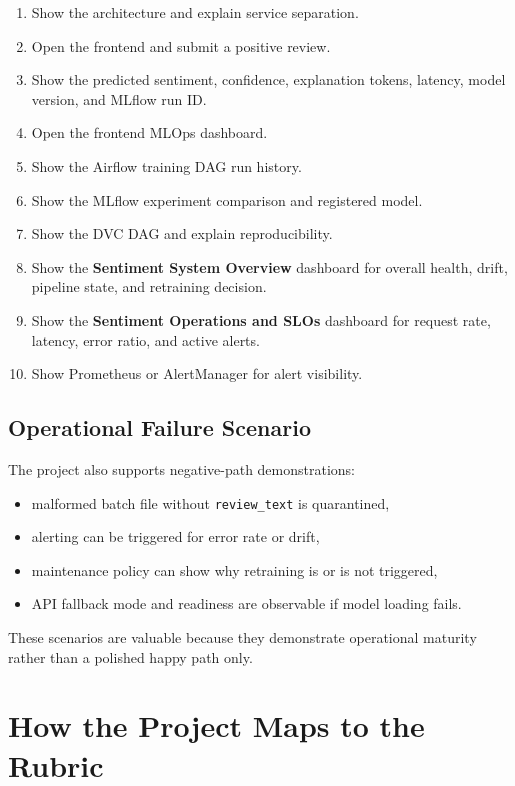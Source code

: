 \documentclass[11pt,a4paper]{article}
\begin{document}
\begin{enumerate}[leftmargin=1.6em]
  \item Show the architecture and explain service separation.
  \item Open the frontend and submit a positive review.
  \item Show the predicted sentiment, confidence, explanation tokens, latency, model version, and MLflow run ID.
  \item Open the frontend MLOps dashboard.
  \item Show the Airflow training DAG run history.
  \item Show the MLflow experiment comparison and registered model.
  \item Show the DVC DAG and explain reproducibility.
  \item Show the \textbf{Sentiment System Overview} dashboard for overall health, drift, pipeline state, and retraining decision.
  \item Show the \textbf{Sentiment Operations and SLOs} dashboard for request rate, latency, error ratio, and active alerts.
  \item Show Prometheus or AlertManager for alert visibility.
\end{enumerate}

\subsection{Operational Failure Scenario}

The project also supports negative-path demonstrations:

\begin{itemize}[leftmargin=1.4em]
  \item malformed batch file without \texttt{review\_text} is quarantined,
  \item alerting can be triggered for error rate or drift,
  \item maintenance policy can show why retraining is or is not triggered,
  \item API fallback mode and readiness are observable if model loading fails.
\end{itemize}

These scenarios are valuable because they demonstrate operational maturity rather than a polished happy path only.

\section{How the Project Maps to the Rubric}
\end{document}
